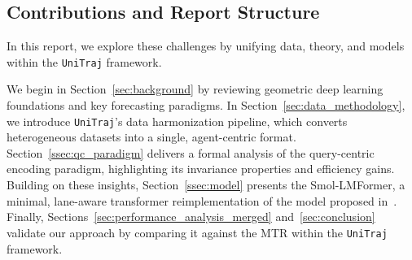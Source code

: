 \subsection{Contributions and Report Structure}
In this report, we explore these challenges by unifying data, theory, and models within the \texttt{UniTraj} framework.

We begin in Section~\ref{sec:background} by reviewing geometric deep learning foundations and key forecasting paradigms. In Section~\ref{sec:data_methodology}, we introduce \texttt{UniTraj}'s data harmonization pipeline, which converts heterogeneous datasets into a single, agent-centric format. Section~\ref{ssec:qc_paradigm} delivers a formal analysis of the query-centric encoding paradigm, highlighting its invariance properties and efficiency gains. Building on these insights, Section~\ref{ssec:model} presents the Smol-LMFormer, a minimal, lane-aware transformer reimplementation of the model proposed in~\cite{lmformerYadav2025}. Finally, Sections~\ref{sec:performance_analysis_merged} and~\ref{sec:conclusion} validate our approach by comparing it against the MTR within the \texttt{UniTraj} framework.

\newpage